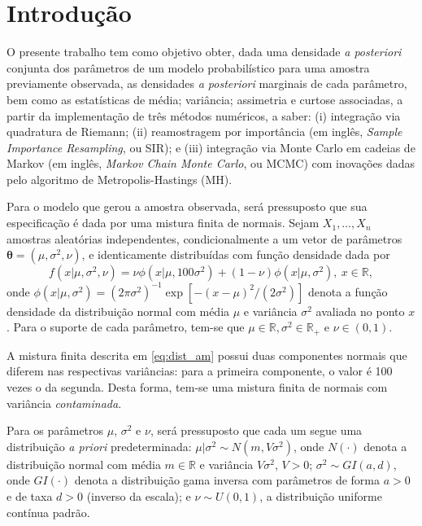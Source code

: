 \section{Introdução}

O presente trabalho tem como objetivo obter, dada uma densidade \textit{a posteriori} conjunta dos parâmetros de um modelo probabilístico para uma amostra previamente observada, as densidades \textit{a posteriori} marginais de cada parâmetro, bem como as estatísticas de média; variância; assimetria e curtose associadas, a partir da implementação de três métodos numéricos, a saber: (i) integração via quadratura de Riemann; (ii) reamostragem por importância (em inglês, \textit{Sample Importance Resampling}, ou SIR); e (iii) integração via Monte Carlo em cadeias de Markov (em inglês, \textit{Markov Chain Monte Carlo}, ou MCMC) com inovações dadas pelo algoritmo de Metropolis-Hastings (MH).

Para o modelo que gerou a amostra observada, será pressuposto que sua especificação é dada por uma mistura finita de normais. Sejam $X_{1}, \ldots, X_{n}$ amostras aleatórias independentes, condicionalmente a um vetor de parâmetros $\bm{\theta} = (\mu, \sigma^2, \nu)$, e identicamente distribuídas com função densidade dada por
\begin{equation}\label{eq:dist_am}
f(x | \mu, \sigma^2, \nu) = \nu \phi(x | \mu, 100 \sigma^2) + (1 - \nu) \phi(x | \mu, \sigma^2), \ x \in \mathbb{R},
\end{equation}
\noindent onde $\phi(x | \mu, \sigma^2) = (2\pi\sigma^2)^{-1} \exp[-(x - \mu)^2/(2\sigma^2)]$ denota a função densidade da distribuição normal com média $\mu$ e variância $\sigma^2$ avaliada no ponto $x$. Para o suporte de cada parâmetro, tem-se que $\mu \in \mathbb{R}, \sigma^2 \in \mathbb{R}_+$ e $\nu \in (0,1)$.

A mistura finita descrita em \eqref{eq:dist_am} possui duas componentes normais que diferem nas respectivas variâncias: para a primeira componente, o valor é 100 vezes o da segunda. Desta forma, tem-se uma mistura finita de normais com variância \textit{contaminada}.

Para os parâmetros $\mu$, $\sigma^2$ e $\nu$, será pressuposto que cada um segue uma distribuição \textit{a priori} predeterminada: $\mu | \sigma^2 \sim{N} (m, V \sigma^2)$, onde $N(\cdot)$ denota a distribuição normal com média $m \in \mathbb{R}$ e variância $V \sigma^2$, $V > 0$; $\sigma^2 \sim{GI} (a,d)$, onde $GI(\cdot)$ denota a distribuição gama inversa com parâmetros de forma $a > 0$ e de taxa $d > 0$ (inverso da escala); e $\nu \sim{U}(0,1)$, a distribuição uniforme contínua padrão.

